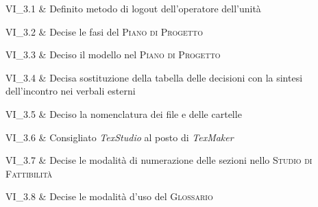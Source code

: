VI\_3.1 & Definito metodo di logout dell'operatore dell'unità

\tabularnewline
VI\_3.2 & Decise le fasi del \textsc{Piano di Progetto}

\tabularnewline
VI\_3.3 & Deciso il modello nel \textsc{Piano di Progetto}

\tabularnewline
VI\_3.4 & Decisa sostituzione della tabella delle decisioni con la sintesi dell'incontro nei verbali esterni

\tabularnewline
VI\_3.5 & Deciso la nomenclatura dei file e delle cartelle

\tabularnewline
VI\_3.6 & Consigliato \textit{TexStudio} al posto di \textit{TexMaker}

\tabularnewline
VI\_3.7 & Decise le modalità di numerazione delle sezioni nello \textsc{Studio di Fattibilità}

\tabularnewline
VI\_3.8 & Decise le modalità d'uso del \textsc{Glossario}
